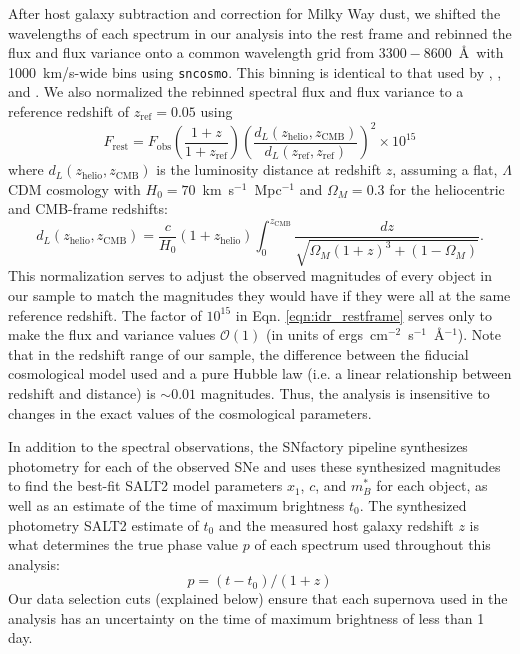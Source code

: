 After host galaxy subtraction and correction for Milky Way dust, we shifted the wavelengths of each spectrum in our analysis into the rest frame and rebinned the flux and flux variance onto a common wavelength grid from $3300 - 8600$~\AA\ with 1000~km/s-wide bins using \texttt{sncosmo}. This binning is identical to that used by \cite{fakhouri_improving_2015}, \cite{saunders_snemo_2018}, and \cite{boone_twins_2020a}. We also normalized the rebinned spectral flux and flux variance to a reference redshift of $z_\mathrm{ref}=0.05$ using
\begin{equation}
    F_\mathrm{rest} = F_\mathrm{obs} \left(\frac{1+z}{1+z_\mathrm{ref}}\right)\left(\frac{d_L(z_\mathrm{helio}, z_\mathrm{CMB})}{d_L(z_\mathrm{ref}, z_\mathrm{ref})}\right)^2 \times 10^{15}
    \label{eqn:idr_restframe}
\end{equation}
where $d_L(z_\mathrm{helio}, z_\mathrm{CMB})$ is the luminosity distance at redshift $z$, assuming a flat, $\Lambda$CDM cosmology with $H_0=70$~km~s$^{-1}$~Mpc$^{-1}$ and $\Omega_M=0.3$ for the heliocentric and CMB-frame redshifts:
\begin{equation}
    d_L(z_\mathrm{helio}, z_\mathrm{CMB}) = \frac{c}{H_0}(1+z_\mathrm{helio})\displaystyle\int_0^{z_\mathrm{CMB}} \frac{dz}{\sqrt{\Omega_M(1+z)^3 + (1-\Omega_M)}}.
\end{equation}
This normalization serves to adjust the observed magnitudes of every object in our sample to match the magnitudes they would have if they were all at the same reference redshift. The factor of $10^{15}$ in Eqn. \ref{eqn:idr_restframe} serves only to make the flux and variance values $\mathcal{O}(1)$ (in units of ergs~cm$^{-2}$~s$^{-1}$~\AA$^{-1}$). Note that in the redshift range of our sample, the difference between the fiducial cosmological model used and a pure Hubble law (i.e. a linear relationship between redshift and distance) is $\sim 0.01$ magnitudes. Thus, the analysis is insensitive to changes in the exact values of the cosmological parameters.

In addition to the spectral observations, the SNfactory pipeline synthesizes photometry for each of the observed SNe and uses these synthesized magnitudes to find the best-fit SALT2 model parameters $x_1$, $c$, and $m_B^*$ for each object, as well as an estimate of the time of maximum brightness $t_0$. The synthesized photometry SALT2 estimate of $t_0$ and the measured host galaxy redshift $z$ is what determines the true phase value $p$ of each spectrum used throughout this analysis:
\begin{equation}
    p = (t - t_0)/(1 + z)
\end{equation}
Our data selection cuts (explained below) ensure that each supernova used in the analysis has an uncertainty on the time of maximum brightness of less than 1 day.

